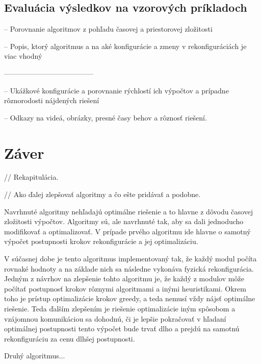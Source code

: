 \documentclass[
  digital, %
  oneside, %
  table,   %
  lof,     %
  nolot,     %
]{fithesis3}
\begin{document}
\section{Evaluácia výsledkov na vzorových príkladoch}
-- Porovnanie algoritmov z pohľadu časovej a priestorovej zložitosti

-- Popis, ktorý algoritmus a na aké konfigurácie a zmeny v rekonfiguráciách je viac vhodný


--------------------------------------


-- Ukážkové konfigurácie a porovnanie rýchlostí ich výpočtov a prípadne rôznorodosti nájdených riešení

-- Odkazy na videá, obrázky, presné časy behov a rôznosť riešení. 






\chapter{Záver}
\label{sec:future}
// Rekapitulácia. 

// Ako ďalej zlepšovať algoritmy a čo ešte pridávať a podobne. 

Navrhnuté algoritmy nehľadajú optimálne riešenie a to hlavne z dôvodu časovej zložitosti výpočtov. Algoritmy sú, ale navrhnuté tak, aby sa dali jednoducho modifikovať a optimalizovať. V prípade prvého algoritmu ide hlavne o samotný výpočet postupnosti krokov rekonfigurácie a jej optimalizáciu. 

V súčasnej dobe je tento algoritmus implementovaný tak, že každý modul počíta rovnaké hodnoty a na základe nich sa následne vykonáva fyzická rekonfigurácia. Jedným z návrhov na zlepšenie tohto algoritmu je, že každý z modulov môže počítať postupnosť krokov rôznymi algoritmami a inými heuristikami. Okrem toho je prístup optimalizácie krokov greedy, a teda nemusí vždy nájsť optimálne riešenie. Teda ďalším zlepšením je riešenie optimalizácie iným spôsobom a vzájomnou komunikáciou sa dohodnú, či je lepšie pokračovať v hľadaní optimálnej postupnosti tento výpočet bude trvať dlho a prejdú na samotnú rekonfiguráciu za cenu dlhšej postupnosti. 

Druhý algoritmus...


\printbibliography[heading=bibintoc] %
\end{document}
